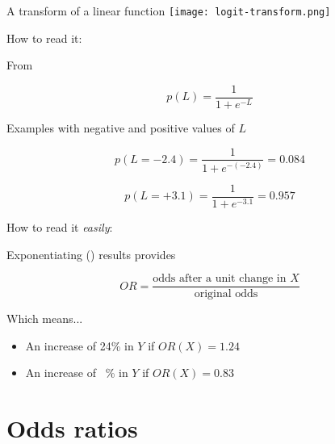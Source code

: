 \documentclass[t]{beamer}
\begin{document}
  \begin{frame}[t]{A  transform of a linear function}
    \texttt{[image: logit-transform.png]}
  \end{frame}
  
  \begin{frame}[c]{How to read it: }

    \begin{block}{From }

      $$p (L) = \frac{1}{1 + e^{-L}}$$

    \end{block}

    \begin{block}{Examples with negative and positive values of $L$}

      $$p(L = -2.4) = \frac{1}{1 + e^{-(-2.4)}} = 0.084$$
      
      $$p(L = +3.1) = \frac{1}{1 + e^{-3.1}} = 0.957$$

    \end{block}

  \end{frame}

  \begin{frame}[c]{How to read it \emph{easily}: }

    \begin{block}{Exponentiating () results provides}

      $$OR = \frac{\textrm{odds after a unit change in~} X}{\textrm{original odds}}$$%

    \end{block}

    \begin{block}{Which means...}

      \begin{itemize}
        \item An increase of 24\% in $Y$ if $OR(X) = 1.24$
        \item An increase of ~\% in $Y$ if $OR(X) = 0.83$%
      \end{itemize}

    \end{block}

  \end{frame}

	\section{Odds ratios}
\end{document}
